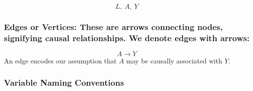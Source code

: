 \documentclass[
  singlecolumn]{report}
\begin{document}
\[
L, ~A, ~ Y
\]

\hypertarget{edges-or-vertices-these-are-arrows-connecting-nodes-signifying-causal-relationships.-we-denote-edges-with-arrows}{%
\subsubsection{\texorpdfstring{\textbf{Edges or Vertices:} These are
arrows connecting nodes, signifying causal relationships. We denote
edges with
arrows:}{Edges or Vertices: These are arrows connecting nodes, signifying causal relationships. We denote edges with arrows:}}\label{edges-or-vertices-these-are-arrows-connecting-nodes-signifying-causal-relationships.-we-denote-edges-with-arrows}}

\[
   A \to Y
\] An edge encodes our assumption that \(A\) may be causally associated
with \(Y\).

\hypertarget{variable-naming-conventions}{%
\subsubsection{\texorpdfstring{\textbf{Variable Naming
Conventions}}{Variable Naming Conventions}}\label{variable-naming-conventions}}
\end{document}
